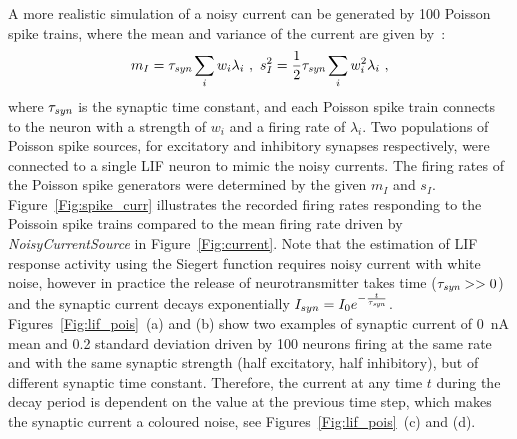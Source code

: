 \DIFdelend A more realistic simulation of a noisy current can be generated by 100 Poisson spike trains, 
	where the mean and variance of the current are given by~\citep{la2008response}:
	\begin{equation}
	m_I = \tau_{\textit{\textrm{syn}}}\sum_i w_i\lambda_{i}~, ~s_I^2=\frac{1}{2}\tau_{\textit{\textrm{syn}}}\sum_i w_i^2\lambda_{i}~,
	\label{equ:distr0}
	\end{equation}
	where $\tau_{\textit{\textrm{syn}}}$ is the synaptic time constant, and each Poisson spike train connects to the neuron with a strength of $w_i$ and a firing rate of $\lambda_i$.
	Two populations of Poisson spike sources, for excitatory and inhibitory synapses respectively, were connected to a single LIF neuron to mimic the noisy currents.
	The firing rates of the Poisson spike generators were determined by the given $m_I$ and $s_I$.
	Figure~\ref{Fig:spike_curr} illustrates the recorded firing rates responding to the Poissoin spike trains compared to the mean firing rate driven by \textit{NoisyCurrentSource} in Figure~\ref{Fig:current}.
	Note that the estimation of LIF response activity using the Siegert function requires noisy current with white noise, however
	in practice the release of neurotransmitter takes time ($\tau_{\textit{\textrm{syn}}} >> 0$) and the synaptic current decays exponentially $I_{syn} = I_0 e^{-\frac{t}{\tau_{\textit{\textrm{syn}}}}}$.
	Figures~\ref{Fig:lif_pois}~(a) and (b) show two examples of synaptic current of 0~nA mean and 0.2 standard deviation driven by 100 neurons firing at the same rate and with the same synaptic strength (half excitatory, half inhibitory), but of different synaptic time constant.
	Therefore, the current at any time $t$ during the decay period is dependent on the value at the previous time step, which makes the synaptic current a coloured noise, see Figures~\ref{Fig:lif_pois}~(c) and (d).

